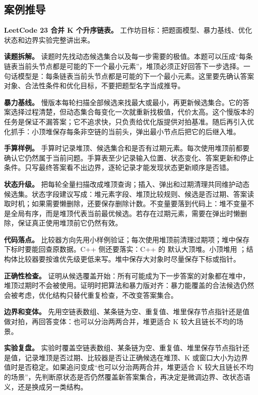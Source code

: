 \subsection{案例推导}

\noindent\textbf{LeetCode 23 合并 K 个升序链表。} 工作坊目标：把题面模型、暴力基线、优化状态和边界实验完整讲出来。

\textbf{读题拆解。} 读题时先找动态候选集合以及每一步需要的极值。本题可以压成“每条链表当前头节点都是可能的下一个最小元素”，堆顶必须正好回答下一步选择。一句话模型是：每条链表当前头节点都是可能的下一个最小元素。这里要先确认答案对象、合法性条件和优化目标，不要把题型名字当成推导。

\textbf{暴力基线。} 慢版本每轮扫描全部候选来找最大或最小，再更新候选集合。它的答案选择过程清楚，但动态集合每变化一次就重新找极值，代价太高。这个慢版本的任务是保证不漏答案；它不追求快，只负责给优化版提供对拍基准。随后再引入优化抓手：小顶堆保存每条非空链的当前头，弹出最小节点后把它的后继入堆。

\textbf{手算样例。} 手算时记录堆顶、候选集合和是否有过期元素。每次使用堆顶前都要确认它仍然属于当前问题。手算表至少记录输入位置、状态变化、答案更新和停止条件。只写最终答案看不出边界，逐轮记录才能发现状态更新顺序是否错。

\textbf{状态升级。} 把每轮全量扫描改成堆顶查询；插入、弹出和过期清理共同维护动态候选集。状态字段建议写成：堆元素字段、堆顶比较规则、候选是否过期、答案读取时机；如果需要懒删除，还要保存删除计数。不变量要落到代码上：堆不变量不是全局有序，而是堆顶代表当前最优候选。若存在过期元素，需要在弹出时懒删除，保证真正使用堆顶前它仍然有效。

\textbf{代码落点。} 比较器方向先用小样例验证；每次使用堆顶前清理过期项；堆中保存下标时要能回查原数据。C++ 侧还要落实：C++ 的  默认大顶堆。小顶堆用 ；结构体比较器要按谁优先级更低来写。堆中保存大对象时尽量保存下标或指针。

\textbf{正确性检查。} 证明从候选覆盖开始：所有可能成为下一步答案的对象都在堆中，堆顶过期时不会被使用。证明时把算法和暴力版对齐：暴力能覆盖的合法候选仍然会被考虑，优化结构只替代重复检查，不改变答案集合。

\textbf{边界和变体。} 先用空链表数组、某条链为空、重复值、堆里保存节点指针还是值做对拍，再回答变体：也可以分治两两合并，堆更适合 K 较大且链长不均的场景。

\textbf{实验复盘。} 实验时覆盖空链表数组、某条链为空、重复值、堆里保存节点指针还是值，记录堆顶是否过期、比较器是否让正确候选在堆顶、K 或窗口大小为边界值时是否稳定。如果追问变成“也可以分治两两合并，堆更适合 K 较大且链长不均的场景”，先判断原状态是否仍然覆盖新答案集合，再决定是微调边界、改状态语义，还是换成另一类结构。

